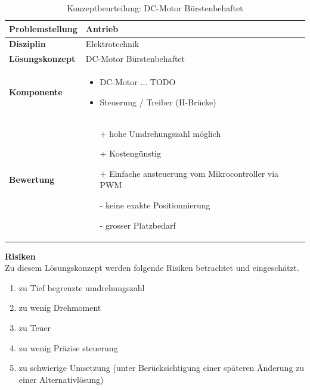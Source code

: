 \documentclass[../../main.tex]{subfiles}
\begin{document}
    \begin{flushleft}
        \begin{table}[H]
        \begin{tabular}{ | l | p{11cm} |}
        \hline
        \textbf{Problemstellung} & Antrieb \\ \hline
        \textbf{Disziplin} & Elektrotechnik \\ \hline
        \textbf{Lösungskonzept} & DC-Motor Bürstenbehaftet\\ \hline
        \textbf{Komponente} & \begin{itemize}
            \item DC-Motor ... TODO
            \item Steuerung / Treiber (H-Brücke)
            \end{itemize}\\ \hline
        \textbf{Bewertung} &  \begin{itemize}
                                \item[+] hohe Umdrehungszahl möglich 
                                \item[+] Kostengünstig 
                                \item[+] Einfache ansteuerung vom Mikrocontroller via PWM 
                                \item[-] keine exakte Positionnierung
                                \item[-] grosser Platzbedarf
                              \end{itemize} \\ \hline
        \end{tabular}
        \caption{Konzeptbeurteilung: DC-Motor Bürstenbehaftet}
        \label{tab:antr_konzept_dcMotor_buerstenbehaftet}
    \end{table}
    \end{flushleft}

    \textbf{Risiken}\\
    Zu diesem Lösungskonzept werden folgende Risiken betrachtet und eingeschätzt.
    \begin{enumerate}[I]
        \item zu Tief begrenzte umdrehungszahl
        \item zu wenig Drehmoment
        \item zu Teuer
        \item zu wenig Präzise steuerung
        \item zu schwierige Umsetzung (unter Berücksichtigung einer späteren Änderung zu einer Alternativlösung)  
    \end{enumerate}
\end{document}
